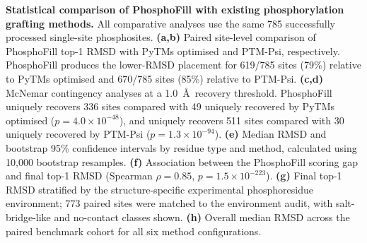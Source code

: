 \caption{\textbf{Statistical comparison of PhosphoFill with existing phosphorylation grafting methods.} All comparative analyses use the same 785 successfully processed single-site phosphosites. \textbf{(a,b)} Paired site-level comparison of PhosphoFill top-1 RMSD with PyTMs optimised and PTM-Psi, respectively. PhosphoFill produces the lower-RMSD placement for 619/785 sites (79\%) relative to PyTMs optimised and 670/785 sites (85\%) relative to PTM-Psi. \textbf{(c,d)} McNemar contingency analyses at a 1.0~\AA\ recovery threshold. PhosphoFill uniquely recovers 336 sites compared with 49 uniquely recovered by PyTMs optimised ($p=4.0\times10^{-48}$), and uniquely recovers 511 sites compared with 30 uniquely recovered by PTM-Psi ($p=1.3\times10^{-94}$). \textbf{(e)} Median RMSD and bootstrap 95\% confidence intervals by residue type and method, calculated using 10,000 bootstrap resamples. \textbf{(f)} Association between the PhosphoFill scoring gap and final top-1 RMSD (Spearman $\rho=0.85$, $p=1.5\times10^{-223}$). \textbf{(g)} Final top-1 RMSD stratified by the structure-specific experimental phosphoresidue environment; 773 paired sites were matched to the environment audit, with salt-bridge-like and no-contact classes shown. \textbf{(h)} Overall median RMSD across the paired benchmark cohort for all six method configurations.}
